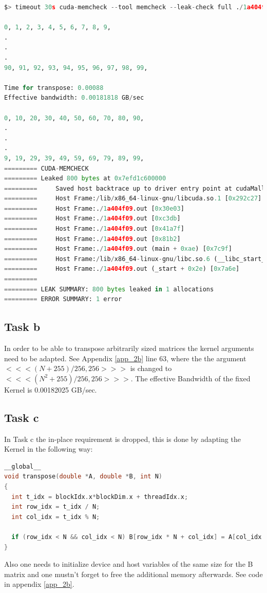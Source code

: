 \begin{lstlisting}[language=python, title=Console Output on RTX3060 Environment for transpose.cu]
$> timeout 30s cuda-memcheck --tool memcheck --leak-check full ./1a404f09.out 2>&1

0, 1, 2, 3, 4, 5, 6, 7, 8, 9,
.
.
.
90, 91, 92, 93, 94, 95, 96, 97, 98, 99,

Time for transpose: 0.00088
Effective bandwidth: 0.00181818 GB/sec

0, 10, 20, 30, 40, 50, 60, 70, 80, 90,
.
.
.
9, 19, 29, 39, 49, 59, 69, 79, 89, 99,
========= CUDA-MEMCHECK
========= Leaked 800 bytes at 0x7efd1c600000
=========     Saved host backtrace up to driver entry point at cudaMalloc time
=========     Host Frame:/lib/x86_64-linux-gnu/libcuda.so.1 [0x292c27]
=========     Host Frame:./1a404f09.out [0x30e03]
=========     Host Frame:./1a404f09.out [0xc3db]
=========     Host Frame:./1a404f09.out [0x41a7f]
=========     Host Frame:./1a404f09.out [0x81b2]
=========     Host Frame:./1a404f09.out (main + 0xae) [0x7c9f]
=========     Host Frame:/lib/x86_64-linux-gnu/libc.so.6 (__libc_start_main + 0xf3) [0x24083]
=========     Host Frame:./1a404f09.out (_start + 0x2e) [0x7a6e]
=========
========= LEAK SUMMARY: 800 bytes leaked in 1 allocations
========= ERROR SUMMARY: 1 error
\end{lstlisting}

\pagebreak

\subsection{Task b}
In order to be able to transpose arbitrarily sized matrices the kernel arguments
need to be adapted. See Appendix \ref{app_2b} line 63, where the the argument
$<<<(N+255) / 256, 256>>>$ is changed to $<<<(N^2+255) / 256, 256>>>$. The effective 
Bandwidth of the fixed Kernel is 0.00182025 GB/sec.

\subsection{Task c}
In Task c the in-place requirement is dropped, this is done by adapting the Kernel
in the following way:

\begin{lstlisting}[language=C++, title=C++ Listing for EX2 c Kernel Part]
__global__
void transpose(double *A, double *B, int N)
{
  int t_idx = blockIdx.x*blockDim.x + threadIdx.x;
  int row_idx = t_idx / N;
  int col_idx = t_idx % N;
  
  if (row_idx < N && col_idx < N) B[row_idx * N + col_idx] = A[col_idx * N + row_idx];
}
\end{lstlisting}

Also one needs to initialize device and host variables of the same size for the B matrix
and one mustn't forget to free the additional memory afterwards. See code in appendix
\ref{app_2b}.



